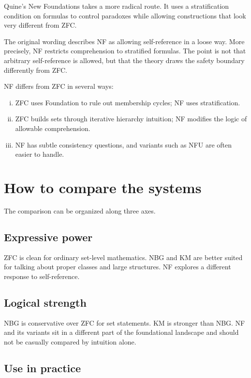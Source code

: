 Quine's New Foundations takes a more radical route.  It uses a stratification condition on formulas to control paradoxes while allowing constructions that look very different from ZFC.

\begin{caution}
The original wording describes NF as allowing self-reference in a loose way.  More precisely, NF restricts comprehension to stratified formulas.  The point is not that arbitrary self-reference is allowed, but that the theory draws the safety boundary differently from ZFC.
\end{caution}

NF differs from ZFC in several ways:
\begin{enumerate}[(i)]
  \item ZFC uses Foundation to rule out membership cycles; NF uses stratification.
  \item ZFC builds sets through iterative hierarchy intuition; NF modifies the logic of allowable comprehension.
  \item NF has subtle consistency questions, and variants such as NFU are often easier to handle.
\end{enumerate}

\section{How to compare the systems}

The comparison can be organized along three axes.

\subsection{Expressive power}

ZFC is clean for ordinary set-level mathematics.  NBG and KM are better suited for talking about proper classes and large structures.  NF explores a different response to self-reference.

\subsection{Logical strength}

NBG is conservative over ZFC for set statements.  KM is stronger than NBG.  NF and its variants sit in a different part of the foundational landscape and should not be casually compared by intuition alone.

\subsection{Use in practice}

